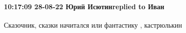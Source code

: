  
 
 
 
 

\paragraph{10:17:09 28-08-22 Юрий Исютинreplied to Иван}

Сказочник, сказки начитался или фантастику , кастрюлькин
